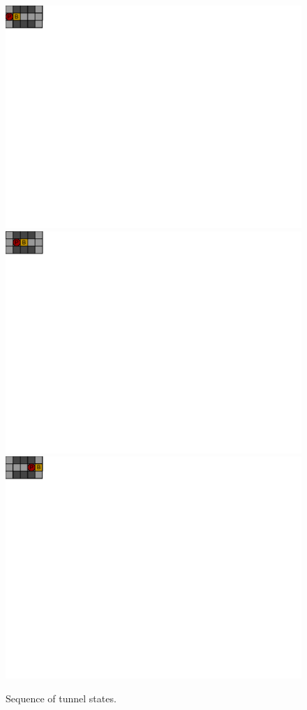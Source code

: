 \documentclass[a4paper,12pt]{article}
\renewcommand{\*}[0]{\cdot}
\begin{document}
\begin{figure}[h!]
    \begin{center}
        \includegraphics{figures/insideTunnel1}
        \includegraphics{figures/insideTunnel2}
        \includegraphics{figures/insideTunnel3}
    \end{center}
    \caption{Sequence of tunnel states.}
    \label{fig:insideTunnel}
\end{figure}
\end{document}
